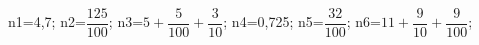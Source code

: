 \documentclass[exercice]{thedocument}%
\begin{document}
%
    \>n1={4,7};%
    \>n2=$\dfrac{125}{100}$;%
    \>n3=$5+\dfrac5{100}+\dfrac3{10}$;%
    \>n4={0,725};%
    \>n5=$\dfrac{32}{100}$;%
    \>n6=$11+\dfrac9{10}+\dfrac9{100}$;%
\end{document}
